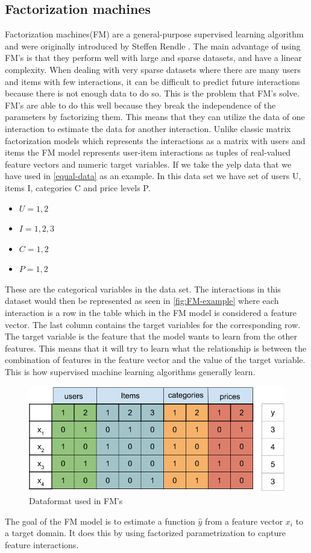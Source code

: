 \subsection{Factorization machines}
Factorization machines(FM) are a general-purpose supervised learning algorithm and were originally introduced by Steffen Rendle \cite{factorization_machines}.
The main advantage of using FM's is that they perform well with large and sparse datasets, and have a linear complexity.
When dealing with very sparse datasets where there are many users and items with few interactions, it can be difficult to predict future interactions because there is not enough data to do so.
This is the problem that FM's solve.
FM's are able to do this well because they break the independence of the parameters by factorizing them.
This means that they can utilize the data of one interaction to estimate the data for another interaction.
Unlike classic matrix factorization models which represents the interactions as a matrix with users and items the FM model represents user-item interactions as tuples of real-valued feature vectors and numeric target variables.
If we take the yelp data that we have used in \autoref{equal-data} as an example.
In this data set we have set of users U, items I, categories C and price levels P.
\begin{itemize}
	\item $U = {1, 2}$
	\item $I = {1, 2 ,3}$
	\item $C = {1, 2}$
	\item $P = {1, 2}$
\end{itemize}
These are the categorical variables in the data set. 
The interactions in this dataset would then be represented as seen in \autoref{fig:FM-example} where each interaction is a row in the table which in the FM model is considered a feature vector.
The last column contains the target variables for the corresponding row.
The target variable is the feature that the model wants to learn from the other features.
This means that it will try to learn what the relationship is between the combination of features in the feature vector and the value of the target variable.
This is how supervised machine learning algorithms generally learn.
\begin{figure}
    \centering
    \includegraphics[scale=0.4]{figures/FM-example.png}
    \caption{Dataformat used in FM's}
    \label{fig:FM-example}
\end{figure}
The goal of the FM model is to estimate a function $\hat{y}$ from a feature vector $x_i$ to a target domain. 
It does this by using factorized parametrization to capture feature interactions.

